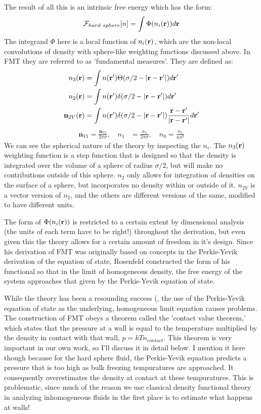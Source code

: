 The result of all this is an intrinsic free energy which has the form:
\begin{align}
  \label{eq:F-FMT-form}
  \mathcal{F}_{hard~sphere}[n] = \int \Phi({n_i(\textbf{r})})d\textbf{r}
\end{align}
The integrand $\Phi$ here is a local function of $n_i(\textbf{r})$, which are
the non-local convolutions of density with sphere-like weighting
functions discussed above.  In FMT they are referred to as
'fundamental measures'.  They are defined as:
\begin{align}
  n_3(\textbf{r}) &= \int n(\textbf{r}') \Theta(\sigma/2 -\left|\textbf{r} - \textbf{r}'\right|)
  d\textbf{r}' \label{eq:FMn3} \\
  n_2(\textbf{r}) &= \int n(\textbf{r}') \delta(\sigma/2 -\left|\textbf{r} - \textbf{r}'\right|) d\textbf{r}' \\
  \mathbf{n}_{2V}(\textbf{r}) &= \int n(\textbf{r}') \delta(\sigma/2 -\left|\textbf{r} - \textbf{r}'\right|) \frac{\textbf{r}-\textbf{r}'}{|\textbf{r}-\textbf{r}'|}d\textbf{r}'
\end{align}
\begin{align}
  \mathbf{n}_{V1} = \frac{\mathbf{n}_{V2}}{2\pi \sigma}, \quad
  n_1 &= \frac{n_2}{2\pi \sigma} , \quad
  n_0 = \frac{n_2}{\pi \sigma^2} \label{eq:FMrest}
\end{align}
We can see the spherical nature of the theory by inspecting the $n_i$.
The $n_3(\textbf{r})$ weighting function is a step function that is designed
so that the density is integrated over the volume of a sphere of
radius $\sigma/2$, but will make no contributions outside of this
sphere.  $n_2$ only allows for integration of densities on the surface
of a sphere, but incorporates no density within or outside of it.
$n_{2V}$ is a vector version of $n_2$, and the others are different
versions of the same, modified to have different units.

The form of $\Phi({n_i(\textbf{r})})$ is restricted to a certain extent by
dimensional analysis (the units of each term have to be right!)
throughout the derivation, but even given this the theory allows for a
certain amount of freedom in it's design.  Since his derivation of FMT
was originally based on concepts in the Perkis-Yevik derivation of the
equation of state, Rosenfeld constructed the form of his functional so
that in the limit of homogeneous density, the free energy of the
system approaches that given by the Perkis-Yevik equation of state.

While the theory has been a resounding success (, the use of the Perkis-Yevik
equation of state as the underlying, homogeneous limit equation causes
problems.  The construction of FMT obeys a theorem called the 'contact
value theorem,' which states that the pressure at a wall is equal to
the temperature multiplied by the density in contact with that wall,
$p=kTn_{contact}$. This theorem is very important in our own work, so
I'll discuss it in detail below.  I mention it here though because for
the hard sphere fluid, the Perkis-Yevik equation predicts a pressure
that is too high as bulk freezing tempuratures are approached.  It
consequently overestimates the density at contact at these
tempuratures.  This is problematic, since much of the reason we use
classical density functional theory in analyzing inhomogeneous fluids
in the first place is to estimate what happens at walls!

